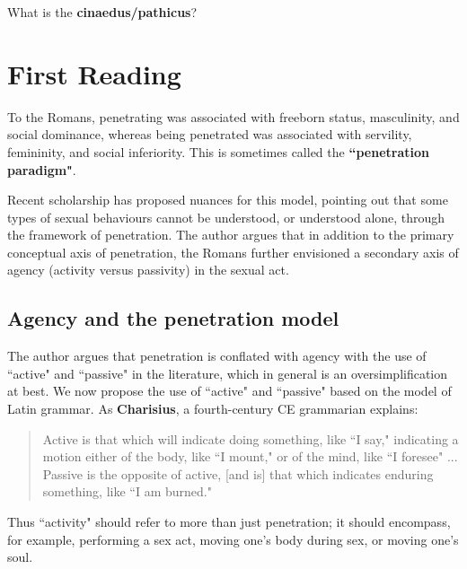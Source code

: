 \begin{qst}
    What is the \textbf{cinaedus/pathicus}?
\end{qst}




\section{First Reading}
\label{sec:FirRead4}


\begin{rmk}
    To the Romans, penetrating was associated with freeborn status, masculinity, and social dominance, whereas being penetrated was associated with servility, femininity, and social inferiority. This is sometimes called the \textbf{``penetration paradigm"}.
\end{rmk}


Recent scholarship has proposed nuances for this model, pointing out that some types of sexual behaviours cannot be understood, or understood alone, through the framework of penetration. The author argues that in addition to the primary conceptual axis of penetration, the Romans further envisioned a secondary axis of agency (activity versus passivity) in the sexual act.

\subsection{Agency and the penetration model}


The author argues that penetration is conflated with agency with the use of ``active" and ``passive" in the literature, which in general is an oversimplification at best. We now propose the use of ``active" and ``passive" based on the model of Latin grammar. As \textbf{Charisius}, a fourth-century CE grammarian explains:

\begin{quotation}
    Active is that which will indicate doing something, like ``I say," indicating a motion either of the body, like ``I mount," or of the mind, like ``I foresee" ... Passive is the opposite of active, [and is] that which indicates enduring something, like ``I am burned."
\end{quotation}

Thus ``activity" should refer to more than just penetration; it should encompass, for example, performing a sex act, moving one's body during sex, or moving one's soul.

